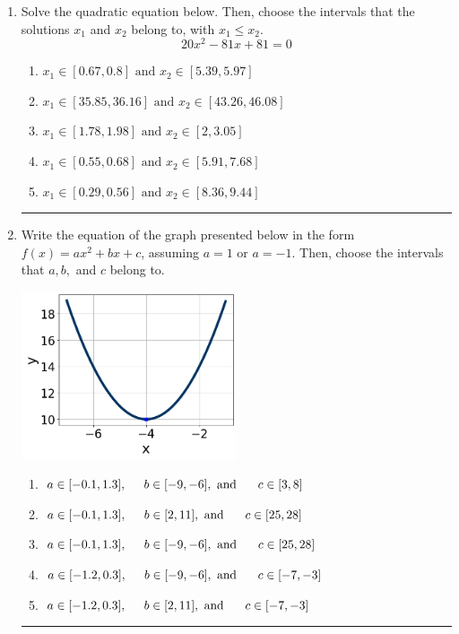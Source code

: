 \documentclass[14pt]{extbook}
\newcommand{\litem}[1]{\item#1\hspace*{-1cm}\rule{\textwidth}{0.4pt}}
\begin{document}
\begin{enumerate}
\litem{
Solve the quadratic equation below. Then, choose the intervals that the solutions $x_1$ and $x_2$ belong to, with $x_1 \leq x_2$.\[ 20x^{2} -81 x + 81 = 0 \]\begin{enumerate}[label=\Alph*.]
\item \( x_1 \in [0.67, 0.8] \text{ and } x_2 \in [5.39, 5.97] \)
\item \( x_1 \in [35.85, 36.16] \text{ and } x_2 \in [43.26, 46.08] \)
\item \( x_1 \in [1.78, 1.98] \text{ and } x_2 \in [2, 3.05] \)
\item \( x_1 \in [0.55, 0.68] \text{ and } x_2 \in [5.91, 7.68] \)
\item \( x_1 \in [0.29, 0.56] \text{ and } x_2 \in [8.36, 9.44] \)

\end{enumerate} }
\litem{
Write the equation of the graph presented below in the form $f(x)=ax^2+bx+c$, assuming  $a=1$ or $a=-1$. Then, choose the intervals that $a, b,$ and $c$ belong to.
\begin{center}
    \includegraphics[width=0.5\textwidth]{../Figures/quadraticGraphToEquationA.png}
\end{center}
\begin{enumerate}[label=\Alph*.]
\item \( a \in [-0.1, 1.3], \hspace*{5mm} b \in [-9, -6], \text{ and } \hspace*{5mm} c \in [3, 8] \)
\item \( a \in [-0.1, 1.3], \hspace*{5mm} b \in [2, 11], \text{ and } \hspace*{5mm} c \in [25, 28] \)
\item \( a \in [-0.1, 1.3], \hspace*{5mm} b \in [-9, -6], \text{ and } \hspace*{5mm} c \in [25, 28] \)
\item \( a \in [-1.2, 0.3], \hspace*{5mm} b \in [-9, -6], \text{ and } \hspace*{5mm} c \in [-7, -3] \)
\item \( a \in [-1.2, 0.3], \hspace*{5mm} b \in [2, 11], \text{ and } \hspace*{5mm} c \in [-7, -3] \)


\end{enumerate}}
\end{enumerate}
\end{document}
